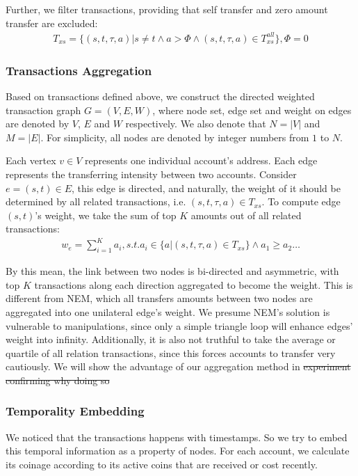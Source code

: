 Further, we filter transactions, providing that self transfer and zero amount transfer are excluded:
\begin{align}
	T_{xs} = \{(s,t,\tau, a)| s \neq t \land a > \Phi \land (s,t,\tau, a) \in T_{xs}^{all} \}, \Phi = 0
\end{align}

\subsubsection{Transactions Aggregation} \label{subsec:aggreate}
 Based on transactions defined above, we construct the directed weighted transaction graph $G=(V, E, W)$, where node set, edge set and weight on edges are denoted by $V$, $E$ and $W$ respectively. We also denote that $N = |V|$ and $M = |E|$. For simplicity, all nodes are denoted by integer numbers from $1$ to $N$.

Each vertex $v \in V$ represents one individual account's address. Each edge represents the transferring intensity between two accounts. Consider $e=(s,t) \in E$, this edge is directed, and naturally, the weight of it should be determined by all related transactions, i.e. $(s,t,\tau, a) \in T_{xs}$. To compute edge $(s,t)$'s weight, we take the sum of top $K$ amounts out of all related transactions:
\begin{align}\label{formula:edgeweight}
w_e = \sum_{i=1}^K a_i, s.t. a_i \in \{a|(s,t,\tau,a) \in T_{xs} \} \land a_1 \geq a_2 \dots
\end{align}

By this mean, the link between two nodes is bi-directed and asymmetric, with top $K$ transactions along each direction aggregated to become the weight. This is different from NEM, which all transfers amounts between two nodes are aggregated into one unilateral edge's weight\cite{nem}. We presume NEM's solution is vulnerable to manipulations, since only a simple triangle loop will enhance edges' weight into infinity. Additionally, it is also not truthful to take the average or quartile of all relation transactions, since this forces accounts to transfer very cautiously. We will show the advantage of our aggregation method in  \st{experiment confirming why doing so}

\subsubsection{Temporality Embedding} \label{subsec:coinage}
We noticed that the transactions happens with timestamps. So we try to embed this temporal information as a property of nodes. For each account, we calculate its coinage according to its active coins that are received or cost recently.

